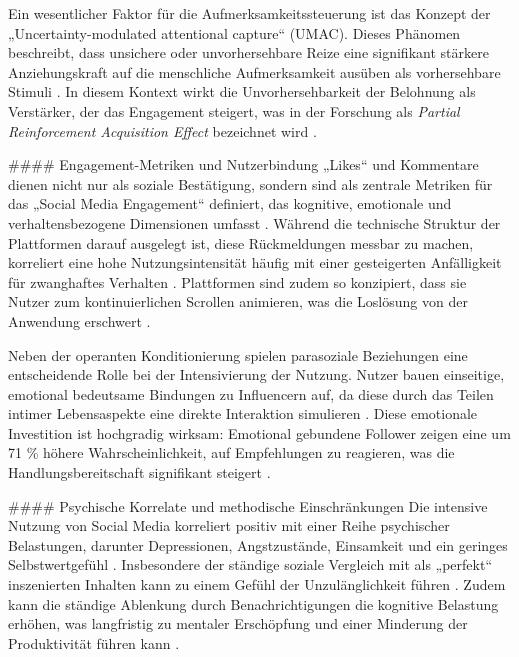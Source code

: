 \documentclass[11pt,a4paper]{article}
\begin{document}
Ein wesentlicher Faktor für die Aufmerksamkeitssteuerung ist das Konzept der „Uncertainty-modulated attentional capture“ (UMAC). Dieses Phänomen beschreibt, dass unsichere oder unvorhersehbare Reize eine signifikant stärkere Anziehungskraft auf die menschliche Aufmerksamkeit ausüben als vorhersehbare Stimuli \autocite{europepmc_42137086}. In diesem Kontext wirkt die Unvorhersehbarkeit der Belohnung als Verstärker, der das Engagement steigert, was in der Forschung als \textit{Partial Reinforcement Acquisition Effect} bezeichnet wird \autocite{europepmc_42137086}.

\#\#\#\# Engagement-Metriken und Nutzerbindung „Likes“ und Kommentare dienen nicht nur als soziale Bestätigung, sondern sind als zentrale Metriken für das „Social Media Engagement“ definiert, das kognitive, emotionale und verhaltensbezogene Dimensionen umfasst \autocite{openalex_W2946816985}. Während die technische Struktur der Plattformen darauf ausgelegt ist, diese Rückmeldungen messbar zu machen, korreliert eine hohe Nutzungsintensität häufig mit einer gesteigerten Anfälligkeit für zwanghaftes Verhalten \autocite{openalex_W2946816985,crossref_10_55032_atskj_psychol_2020_1103}. Plattformen sind zudem so konzipiert, dass sie Nutzer zum kontinuierlichen Scrollen animieren, was die Loslösung von der Anwendung erschwert \autocite{grey_grey_3467cac0f11d4b1e86319128da218a3e}.

Neben der operanten Konditionierung spielen parasoziale Beziehungen eine entscheidende Rolle bei der Intensivierung der Nutzung. Nutzer bauen einseitige, emotional bedeutsame Bindungen zu Influencern auf, da diese durch das Teilen intimer Lebensaspekte eine direkte Interaktion simulieren \autocite{europepmc_42073973,grey_grey_5d5c282590c448fc8776b04f78a08de5}. Diese emotionale Investition ist hochgradig wirksam: Emotional gebundene Follower zeigen eine um 71 \% höhere Wahrscheinlichkeit, auf Empfehlungen zu reagieren, was die Handlungsbereitschaft signifikant steigert \autocite{grey_grey_5d5c282590c448fc8776b04f78a08de5}.

\#\#\#\# Psychische Korrelate und methodische Einschränkungen Die intensive Nutzung von Social Media korreliert positiv mit einer Reihe psychischer Belastungen, darunter Depressionen, Angstzustände, Einsamkeit und ein geringes Selbstwertgefühl \autocite{doaj_10febcbb5e60420699a1d4570a075832,openalex_W2924664363}. Insbesondere der ständige soziale Vergleich mit als „perfekt“ inszenierten Inhalten kann zu einem Gefühl der Unzulänglichkeit führen \autocite{grey_grey_3467cac0f11d4b1e86319128da218a3e,grey_grey_f99abd6bfbd04efc8def60bb6988ce35}. Zudem kann die ständige Ablenkung durch Benachrichtigungen die kognitive Belastung erhöhen, was langfristig zu mentaler Erschöpfung und einer Minderung der Produktivität führen kann \autocite{grey_grey_d4bc9c0d0e8441ba90398520e73af07d}.
\end{document}
